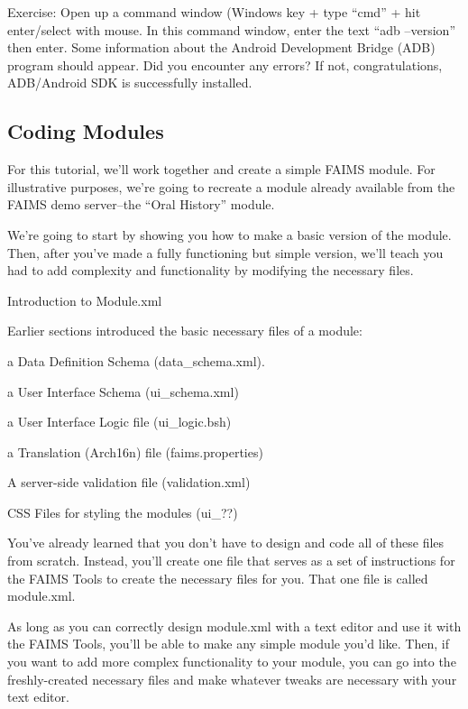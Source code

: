 Exercise: Open up a command window (Windows key + type “cmd” + hit enter/select with mouse. In this command window, enter the text “adb --version” then enter. Some information about the Android Development Bridge (ADB) program should appear. Did you encounter any errors? If not, congratulations, ADB/Android SDK is successfully installed.

\subsection[coding-modules]{Coding Modules}

For this tutorial, we'll work together and create a simple FAIMS module. For illustrative purposes, we're going to recreate a module already available from the FAIMS demo server--the “Oral History” module.

We're going to start by showing you how to make a basic version of the module. Then, after you've made a fully functioning but simple version, we'll teach you had to add complexity and functionality by modifying the necessary files.

Introduction to Module.xml

Earlier sections introduced the basic necessary files of a module:

\startitemize[n][stopper=.]
\item
  \startblockquote
  a Data Definition Schema (data_schema.xml).
  \stopblockquote
\item
  \startblockquote
  a User Interface Schema (ui_schema.xml)
  \stopblockquote
\item
  \startblockquote
  a User Interface Logic file (ui_logic.bsh)
  \stopblockquote
\item
  \startblockquote
  a Translation (Arch16n) file (faims.properties)
  \stopblockquote
\item
  \startblockquote
  A server-side validation file (validation.xml)
  \stopblockquote
\item
  \startblockquote
  CSS Files for styling the modules (ui_??)
  \stopblockquote
\stopitemize

You've already learned that you don't have to design and code all of these files from scratch. Instead, you'll create one file that serves as a set of instructions for the FAIMS Tools to create the necessary files for you. That one file is called module.xml.

As long as you can correctly design module.xml with a text editor and use it with the FAIMS Tools, you'll be able to make any simple module you'd like. Then, if you want to add more complex functionality to your module, you can go into the freshly-created necessary files and make whatever tweaks are necessary with your text editor.

